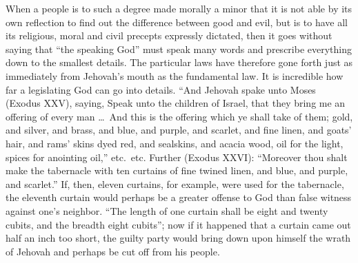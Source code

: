 \documentclass[12pt]{book}
\newcommand{\opage}[1]{\marginnote{\footnotesize\textit{[#1]}}}
\begin{document}
When a people is to such a degree made morally a minor that it is not
able by its own reflection to find out the difference between good and
evil, but is to have all
\opage{180}\setcounter{footnote}{0}%
its religious, moral and civil precepts expressly dictated, then it goes
without saying that ``the speaking God'' must speak many words and
prescribe everything down to the smallest details. The particular laws
have therefore gone forth just as immediately from Jehovah's mouth as the
fundamental law. It is incredible how far a legislating God can go into
details. ``And Jehovah spake unto Moses (Exodus XXV), saying, Speak unto
the children of Israel, that they bring me an offering of every man \dots\
And this is the offering which ye shall take of them; gold, and silver,
and brass, and blue, and purple, and scarlet, and fine linen, and goats'
hair, and rams' skins dyed red, and sealskins, and acacia wood, oil for
the light, spices for anointing oil,'' etc.\ etc. Further (Exodus XXVI):
``Moreover thou shalt make the tabernacle with ten curtains of fine twined
linen, and blue, and purple, and scarlet.'' If, then, eleven curtains,
for example, were used for the tabernacle, the eleventh curtain would
perhaps be a greater offense to God than false witness against one's
neighbor. ``The length of one curtain shall be eight and twenty cubits,
and the breadth eight cubits''; now if it happened that a curtain came out
half an inch too short, the guilty party would bring down upon himself the
wrath of Jehovah and perhaps be cut off from his people.
\end{document}
